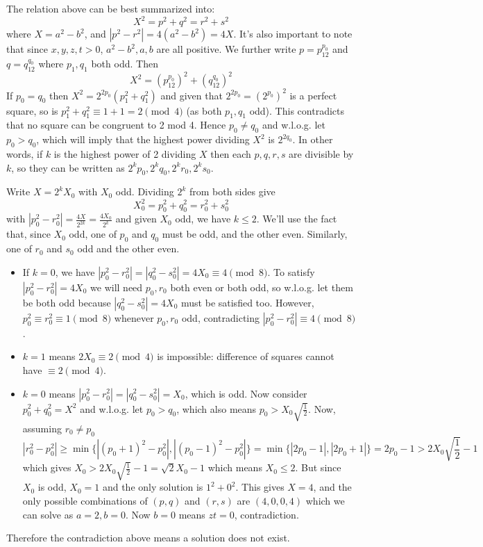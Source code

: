 \documentclass[11pt,a4paper]{article}
\begin{document}
\begin{enumerate}
	The relation above can be best summarized into: 
	\[
	X^2=p^2+q^2=r^2+s^2
	\]
	where $X=a^2-b^2$, and $|p^2-r^2|=4(a^2-b^2)=4X$. 
	It's also important to note that since $x, y, z, t>0$, $a^2-b^2, a, b$ are all positive. 
	We further write $p=p_12^{p_0}$ and $q=q_12^{q_0}$ where $p_1, q_1$ both odd. Then 
	\[
	X^2=(p_12^{p_0})^2+(q_12^{q_0})^2
	\]
	If $p_0=q_0$ then $X^2=2^{2p_0}(p_1^2+q_1^2)$ and given that $2^{2p_0}=(2^{p_0})^2$ is a perfect square, so is $p_1^2+q_1^2\equiv 1+1=2\pmod{4}$ (as both $p_1, q_1$ odd). This contradicts that no square can be congruent to 2 mod 4. Hence $p_0\neq q_0$ and w.l.o.g. let $p_0>q_0$, which will imply that the highest power dividing $X^2$ is $2^{2q_0}$. In other words, if $k$ is the highest power of 2 dividing $X$ then each $p, q, r, s$ are divisible by $k$, so they can be written as $2^kp_0, 2^kq_0, 2^kr_0, 2^ks_0$. 
	
	Write $X=2^kX_0$ with $X_0$ odd. Dividing $2^k$ from both sides give 
	\[
	X_0^2=p_0^2+q_0^2=r_0^2+s_0^2
	\]
	with $|p_0^2-r_0^2|=\frac{4X}{2^{2k}}=\frac{4X_0}{2^k}$ and given $X_0$ odd, we have $k\le 2$. We'll use the fact that, since $X_0$ odd, one of $p_0$ and $q_0$ must be odd, and the other even. Similarly, one of $r_0$ and $s_0$ odd and the other even. 
	
	\begin{itemize}
		\item If $k=0$, we have $|p_0^2-r_0^2|=|q_0^2-s_0^2|=4X_0\equiv 4\pmod{8}$. 
		To satisfy $|p_0^2-r_0^2|=4X_0$ we will need $p_0, r_0$ both even or both odd, so w.l.o.g. let them be both odd because $|q_0^2-s_0^2|=4X_0$ must be satisfied too. 
		However, $p_0^2\equiv r_0^2\equiv 1\pmod{8}$ whenever $p_0, r_0$ odd, contradicting $|p_0^2-r_0^2|\equiv 4\pmod{8}$. 
		
		\item $k=1$ means $2X_0\equiv 2\pmod{4}$ is impossible: difference of squares cannot have $\equiv 2\pmod{4}$. 
		\item $k=0$ means $|p_0^2-r_0^2|=|q_0^2-s_0^2|=X_0$, which is odd. Now consider $p_0^2+q_0^2=X^2$ and w.l.o.g. let $p_0>q_0$, which also means $p_0>X_0\sqrt{\frac{1}{2}}$. 
		Now, assuming $r_0\neq p_0$
		\[
		|r_0^2-p_0^2|\ge\min\{|(p_0+1)^2-p_0^2|, |(p_0-1)^2-p_0^2|\}=\min\{|2p_0-1|, |2p_0+1|\}=2p_0-1
		>2X_0\sqrt{\frac{1}{2}}-1
		\]
		which gives $X_0>2X_0\sqrt{\frac{1}{2}}-1=\sqrt{2}X_0-1$ which means $X_0\le 2$. But since $X_0$ is odd, $X_0=1$ and the only solution is $1^2+0^2$. This gives $X=4$, and the only possible combinations of $(p, q)$ and $(r, s)$ are $(4, 0, 0, 4)$ which we can solve as $a=2, b=0$. Now $b=0$ means $zt=0$, contradiction. 
	\end{itemize}
	Therefore the contradiction above means a solution does not exist. 
	\end{enumerate}
\end{document}
